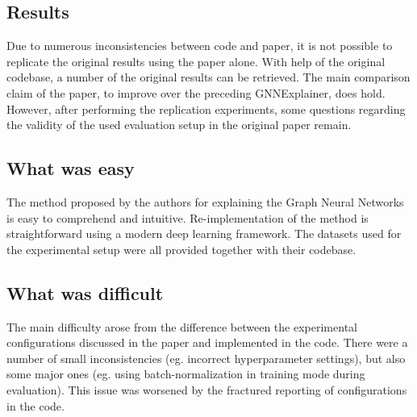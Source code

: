 \documentclass{article}
\begin{document}
\subsection*{Results}
Due to numerous inconsistencies between code and paper, it is not possible to replicate the original results using the paper alone. With help of the original codebase, a number of the original results can be retrieved. The main comparison claim of the paper, to improve over the preceding GNNExplainer, does hold. However, after performing the replication experiments, some questions regarding the validity of the used evaluation setup in the original paper remain. 



\subsection*{What was easy}

The method proposed by the authors for explaining the Graph Neural Networks is easy to comprehend and intuitive. Re-implementation of the method is straightforward using a modern deep learning framework. The datasets used for the experimental setup were all provided together with their codebase. 


\subsection*{What was difficult}

The main difficulty arose from the difference between the experimental configurations discussed in the paper and implemented in the code. There were a number of small inconsistencies (eg. incorrect hyperparameter settings), but also some major ones (eg. using batch-normalization in training mode during evaluation). This issue was worsened by the fractured reporting of configurations in the code. 
\end{document}
